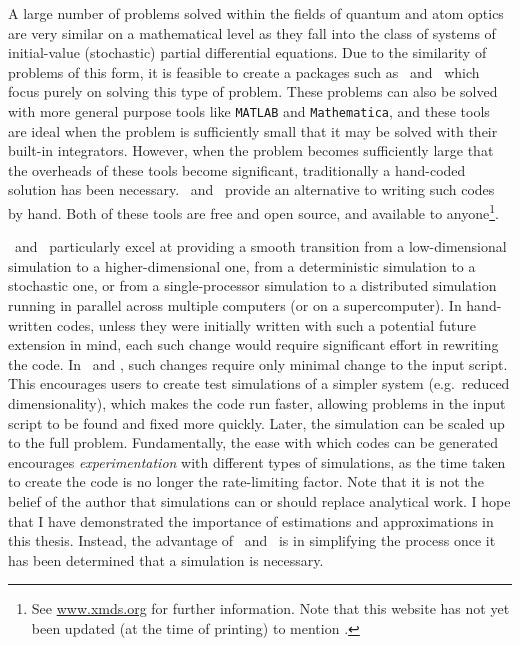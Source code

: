 A large number of problems solved within the fields of quantum and atom optics are very similar on a mathematical level as they fall into the class of systems of initial-value (stochastic) partial differential equations.  Due to the similarity of problems of this form, it is feasible to create a packages such as \XMDS\ and \xpdeint\ which focus purely on solving this type of problem.  These problems can also be solved with more general purpose tools like \texttt{MATLAB} and \texttt{Mathematica}, and these tools are ideal when the problem is sufficiently small that it may be solved with their built-in integrators.  However, when the problem becomes sufficiently large that the overheads of these tools become significant, traditionally a hand-coded solution has been necessary.  \XMDS\ and \xpdeint\ provide an alternative to writing such codes by hand.  Both of these tools are free and open source, and available to anyone\footnote{See \url{www.xmds.org} for further information.  Note that this website has not yet been updated (at the time of printing) to mention \xpdeint.}.

\XMDS\ and \xpdeint\ particularly excel at providing a smooth transition from a low-dimensional simulation to a higher-dimensional one, from a deterministic simulation to a stochastic one, or from a single-processor simulation to a distributed simulation running in parallel across multiple computers (or on a supercomputer).  In hand-written codes, unless they were initially written with such a potential future extension in mind, each such change would require significant effort in rewriting the code.  In \XMDS\ and \xpdeint, such changes require only minimal change to the input script.  This encourages users to create test simulations of a simpler system (e.g.\ reduced dimensionality), which makes the code run faster, allowing problems in the input script to be found and fixed more quickly.  Later, the simulation can be scaled up to the full problem.  Fundamentally, the ease with which codes can be generated encourages \emph{experimentation} with different types of simulations, as the time taken to create the code is no longer the rate-limiting factor.  Note that it is not the belief of the author that simulations can or should replace analytical work.  I hope that I have demonstrated the importance of estimations and approximations in this thesis.  Instead, the advantage of \XMDS\ and \xpdeint\ is in simplifying the process once it has been determined that a simulation is necessary.

\parasep

